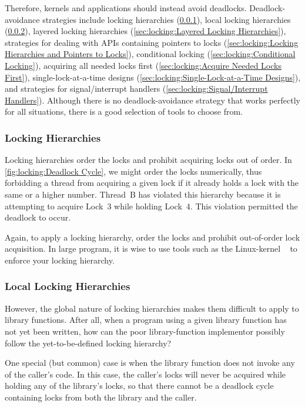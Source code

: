 Therefore, kernels and applications should instead avoid deadlocks.
Deadlock-avoidance strategies include locking hierarchies
(\cref{sec:locking:Locking Hierarchies}),
local locking hierarchies
(\cref{sec:locking:Local Locking Hierarchies}),
layered locking hierarchies
(\cref{sec:locking:Layered Locking Hierarchies}),
strategies for dealing with APIs containing pointers to locks
(\cref{sec:locking:Locking Hierarchies and Pointers to Locks}),
conditional locking
(\cref{sec:locking:Conditional Locking}),
acquiring all needed locks first
(\cref{sec:locking:Acquire Needed Locks First}),
single-lock-at-a-time designs
(\cref{sec:locking:Single-Lock-at-a-Time Designs}),
and strategies for signal/interrupt handlers
(\cref{sec:locking:Signal/Interrupt Handlers}).
Although there is no deadlock-avoidance strategy that works perfectly
for all situations, there is a good selection of tools to choose from.

\subsubsection{Locking Hierarchies}
\label{sec:locking:Locking Hierarchies}

Locking hierarchies order the locks and prohibit acquiring locks out
of order.
In \cref{fig:locking:Deadlock Cycle},
we might order the locks numerically, thus forbidding a thread
from acquiring a given lock if it already holds a lock
with the same or a higher number.
Thread~B has violated this hierarchy because it is attempting to
acquire Lock~3 while holding Lock~4.
This violation permitted the deadlock to occur.

Again, to apply a locking hierarchy, order the locks and prohibit
out-of-order lock acquisition.
In large program, it is wise to use tools such as the Linux-kernel
~\cite{JonathanCorbet2006lockdep}
to enforce your locking hierarchy.

\subsubsection{Local Locking Hierarchies}
\label{sec:locking:Local Locking Hierarchies}

However, the global nature of locking hierarchies makes them difficult to
apply to library functions.
After all, when a program using a given library function has not yet
been written, how can the poor library-function implementor possibly
follow the yet-to-be-defined locking hierarchy?

One special (but common) case is when the library function does not
invoke any of the caller's code.
In this case, the caller's locks will never be acquired while holding
any of the library's locks, so that there cannot be a deadlock cycle
containing locks from both the library and the caller.

